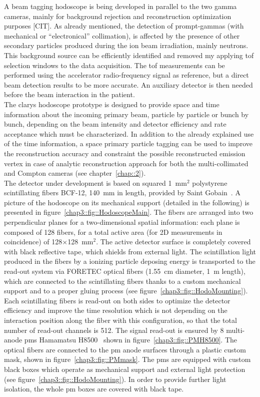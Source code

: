 A beam tagging hodoscope is being developed in parallel to the two gamma cameras, mainly for background rejection and reconstruction optimization purposes [CIT]. As already mentioned, the detection of prompt-gammas (with mechanical or \enquote{electronical} collimation), is affected by the presence of other secondary particles produced during the ion beam irradiation, mainly neutrons. This background source can be efficiently identified and removed my applying \gls{tof} selection windows to the data acquisition. The \gls{tof} measurements can be performed using the accelerator radio-frequency signal as reference, but a direct beam detection results to be more accurate. An auxiliary detector is then needed before the beam interaction in the patient.\\ 
The \gls{clarys} hodoscope prototype is designed to provide space and time information about the incoming primary beam, particle by particle or bunch by bunch, depending on the beam intensity and detector efficiency and rate acceptance which must be characterized. In addition to the already explained use of the time information, a space primary particle tagging can be used to improve the reconstruction accuracy and constraint the possible reconstructed emission vertex in case of analytic reconstruction approach for both the multi-collimated and Compton cameras (see chapter~\ref{chap::2}).\\  
The detector under development is based on squared 1~mm$^{2}$ polystyrene scintillating fibers BCF-12, 140~mm in length, provided by Saint Gobain~\parencite{SaintGobain2017}. A picture of the hodoscope on its mechanical support (detailed in the following) is presented in figure~\ref{chap3::fig::HodoscopeMain}. The fibers are arranged into two perpendicular planes for a two-dimensional spatial information: each plane is composed of 128 fibers, for a total active area (for 2D measurements in coincidence) of 128$\times$128~mm$^{2}$. The active detector surface is completely covered with black reflective tape, which shields from external light. The scintillation light produced in the fibers by a ionizing particle deposing energy is transported to the read-out system via FORETEC optical fibers (1.55~cm diameter, 1~m length), which are connected to the scintillating fibers thanks to a custom mechanical support and to a proper gluing process (see figure~\ref{chap3::fig::HodoMounting}). Each scintillating fibers is read-out on both sides to optimize the detector efficiency and improve the time resolution which is not depending on the interaction position along the fiber with this configuration, so that the total number of read-out channels is 512. The signal read-out is ensured by 8 multi-anode \glspl{pm} Hamamatsu H8500~\parencite{Hamamatsu2006} shown in figure~\ref{chap3::fig::PMH8500}. The optical fibers are connected to the \gls{pm} anode surfaces through a plastic custom mask, shown in figure~\ref{chap3::fig::PMmask}. The \glspl{pm} are equipped with custom black boxes which operate as mechanical support and external light protection (see figure~\ref{chap3::fig::HodoMounting}). In order to provide further light isolation, the whole \gls{pm} boxes are covered with black tape.\\
